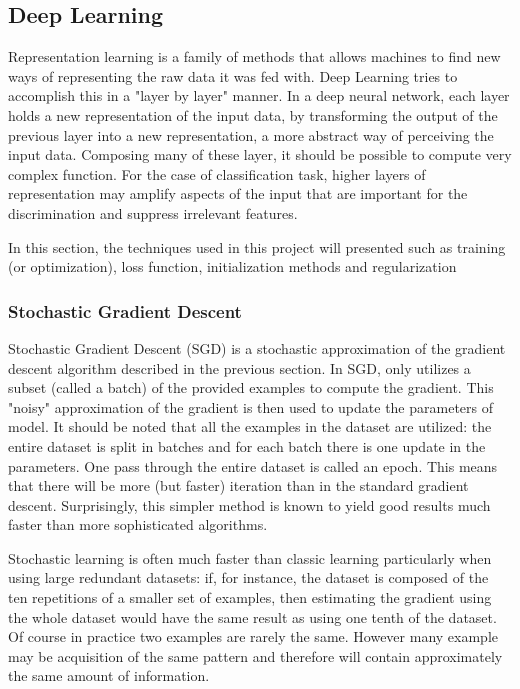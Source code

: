 \documentclass{article}
\begin{document}
\subsection{Deep Learning}
\label{subsec:Deep-Learning}
Representation learning is a family of methods that allows machines to find new ways of representing the raw data it was fed with. Deep Learning tries to accomplish this in a "layer by layer" manner. In a deep neural network, each layer holds a new representation of the input data, by transforming the output of the previous layer into a new representation, a more abstract way of perceiving the input data. Composing many of these layer, it should be possible to compute very complex function. For the case of classification task, higher layers of representation may amplify aspects of the input that are important for the discrimination and suppress irrelevant features.

In this section, the techniques used in this project will presented such as training (or optimization), loss function, initialization methods and regularization

\subsubsection{Stochastic Gradient Descent}
\label{subsubsec:SGD}
Stochastic Gradient Descent (SGD) is a stochastic approximation of the gradient descent algorithm described in the previous section. In SGD, only utilizes a subset (called a batch) of the provided examples to compute the gradient. This "noisy" approximation of the gradient is then used to update the parameters of model. It should be noted that all the examples in the dataset are utilized: the entire dataset is split in batches and for each batch there is one update in the parameters. One pass through the entire dataset is called an epoch. This means that there will be more (but faster) iteration than in the standard gradient descent. Surprisingly, this simpler method is known to yield good results much faster than more sophisticated algorithms.

Stochastic learning is often much faster than classic learning particularly when using large redundant datasets: if, for instance, the dataset is composed of the ten repetitions of a smaller set of examples, then estimating the gradient using the whole dataset would have the same result as using one tenth of the dataset. Of course in practice two examples are rarely the same. However many example may be acquisition of the same pattern and therefore will contain approximately the same amount of information.
\end{document}
